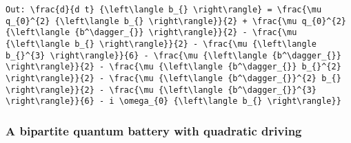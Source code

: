 \documentclass[5p, twocolumn, 10pt, sort&compress]{elsarticle}
\begin{document}
\newpage
\begin{verbatim}
Out: \frac{d}{d t} {\left\langle b_{} \right\rangle} = \frac{\mu q_{0}^{2} {\left\langle b_{} \right\rangle}}{2} + \frac{\mu q_{0}^{2} {\left\langle {b^\dagger_{}} \right\rangle}}{2} - \frac{\mu {\left\langle b_{} \right\rangle}}{2} - \frac{\mu {\left\langle b_{}^{3} \right\rangle}}{6} - \frac{\mu {\left\langle {b^\dagger_{}} \right\rangle}}{2} - \frac{\mu {\left\langle {b^\dagger_{}} b_{}^{2} \right\rangle}}{2} - \frac{\mu {\left\langle {b^\dagger_{}}^{2} b_{} \right\rangle}}{2} - \frac{\mu {\left\langle {b^\dagger_{}}^{3} \right\rangle}}{6} - i \omega_{0} {\left\langle b_{} \right\rangle}}
\end{verbatim}

\subsubsection{A bipartite quantum battery with quadratic driving}
\end{document}
